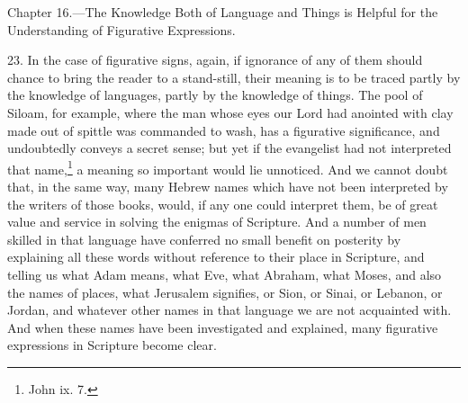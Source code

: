 
Chapter 16.—The Knowledge Both of Language and Things is Helpful for the Understanding of Figurative Expressions.

23. In the case of figurative signs, again, if ignorance of any of them should chance to bring the reader to a stand-still, their meaning is to be traced partly by the knowledge of languages, partly by the knowledge of things. The pool of Siloam, for example, where the man whose eyes our Lord had anointed with clay made out of spittle was commanded to wash, has a figurative significance, and undoubtedly conveys a secret sense; but yet if the evangelist had not interpreted that name,\footnote{John ix. 7.} a meaning so important would lie unnoticed. And we cannot doubt that, in the same way, many Hebrew names which have not been interpreted by the writers of those books, would, if any one could interpret them, be of great value and service in solving the enigmas of Scripture. And a number of men skilled in that language have conferred no small benefit on posterity by explaining all these words without reference to their place in Scripture, and telling us what Adam means, what Eve, what Abraham, what Moses, and also the names of places, what Jerusalem signifies, or Sion, or Sinai, or Lebanon, or Jordan, and whatever other names in that language we are not acquainted with. And when these names have been investigated and explained, many figurative expressions in Scripture become clear.

